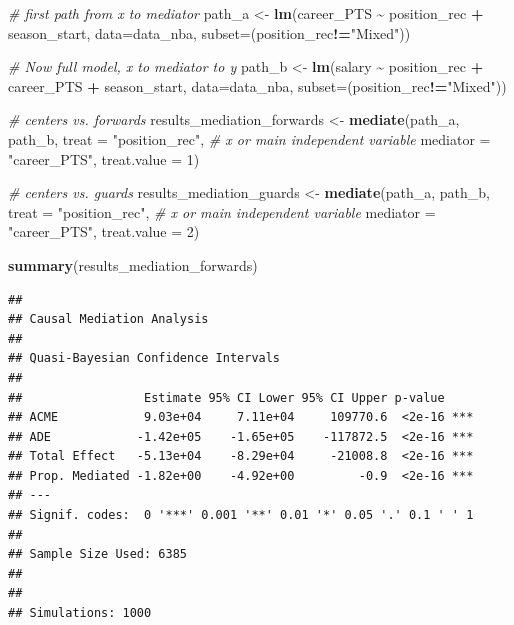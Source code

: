 \documentclass[
]{book}
\newenvironment{Shaded}{\begin{snugshade}}{\end{snugshade}}
\newcommand{\AttributeTok}[1]{\textcolor[rgb]{0.13,0.29,0.53}{#1}}
\newcommand{\CommentTok}[1]{\textcolor[rgb]{0.56,0.35,0.01}{\textit{#1}}}
\newcommand{\DecValTok}[1]{\textcolor[rgb]{0.00,0.00,0.81}{#1}}
\newcommand{\FunctionTok}[1]{\textcolor[rgb]{0.13,0.29,0.53}{\textbf{#1}}}
\newcommand{\NormalTok}[1]{#1}
\newcommand{\OtherTok}[1]{\textcolor[rgb]{0.56,0.35,0.01}{#1}}
\newcommand{\SpecialCharTok}[1]{\textcolor[rgb]{0.81,0.36,0.00}{\textbf{#1}}}
\newcommand{\StringTok}[1]{\textcolor[rgb]{0.31,0.60,0.02}{#1}}
\begin{document}
\begin{Shaded}
\begin{Highlighting}[]
\CommentTok{\# first path from x to mediator}
\NormalTok{path\_a }\OtherTok{\textless{}{-}} \FunctionTok{lm}\NormalTok{(career\_PTS }\SpecialCharTok{\textasciitilde{}}\NormalTok{ position\_rec }\SpecialCharTok{+}\NormalTok{ season\_start, }\AttributeTok{data=}\NormalTok{data\_nba, }\AttributeTok{subset=}\NormalTok{(position\_rec}\SpecialCharTok{!=}\StringTok{"Mixed"}\NormalTok{))}

\CommentTok{\# Now full model, x to mediator to y}
\NormalTok{path\_b }\OtherTok{\textless{}{-}} \FunctionTok{lm}\NormalTok{(salary }\SpecialCharTok{\textasciitilde{}}\NormalTok{ position\_rec }\SpecialCharTok{+}\NormalTok{ career\_PTS }\SpecialCharTok{+}\NormalTok{ season\_start, }\AttributeTok{data=}\NormalTok{data\_nba, }\AttributeTok{subset=}\NormalTok{(position\_rec}\SpecialCharTok{!=}\StringTok{"Mixed"}\NormalTok{))}

\CommentTok{\# centers vs. forwards}
\NormalTok{results\_mediation\_forwards }\OtherTok{\textless{}{-}} \FunctionTok{mediate}\NormalTok{(path\_a, path\_b,}
                             \AttributeTok{treat =} \StringTok{"position\_rec"}\NormalTok{, }\CommentTok{\# x or main independent variable}
                             \AttributeTok{mediator =} \StringTok{"career\_PTS"}\NormalTok{,}
                             \AttributeTok{treat.value =} \DecValTok{1}\NormalTok{)}

\CommentTok{\# centers vs. guards}
\NormalTok{results\_mediation\_guards }\OtherTok{\textless{}{-}} \FunctionTok{mediate}\NormalTok{(path\_a, path\_b,}
                             \AttributeTok{treat =} \StringTok{"position\_rec"}\NormalTok{, }\CommentTok{\# x or main independent variable}
                             \AttributeTok{mediator =} \StringTok{"career\_PTS"}\NormalTok{,}
                             \AttributeTok{treat.value =} \DecValTok{2}\NormalTok{)}

\FunctionTok{summary}\NormalTok{(results\_mediation\_forwards)}
\end{Highlighting}
\end{Shaded}

\begin{verbatim}
## 
## Causal Mediation Analysis 
## 
## Quasi-Bayesian Confidence Intervals
## 
##                 Estimate 95% CI Lower 95% CI Upper p-value    
## ACME            9.03e+04     7.11e+04     109770.6  <2e-16 ***
## ADE            -1.42e+05    -1.65e+05    -117872.5  <2e-16 ***
## Total Effect   -5.13e+04    -8.29e+04     -21008.8  <2e-16 ***
## Prop. Mediated -1.82e+00    -4.92e+00         -0.9  <2e-16 ***
## ---
## Signif. codes:  0 '***' 0.001 '**' 0.01 '*' 0.05 '.' 0.1 ' ' 1
## 
## Sample Size Used: 6385 
## 
## 
## Simulations: 1000
\end{verbatim}
\end{document}
